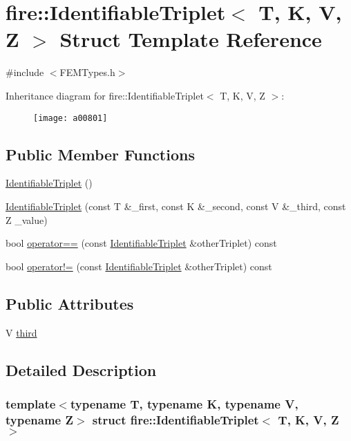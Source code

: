 \hypertarget{a00801}{}\section{fire\+:\+:Identifiable\+Triplet$<$ T, K, V, Z $>$ Struct Template Reference}
\label{a00801}


{\ttfamily \#include $<$F\+E\+M\+Types.\+h$>$}

Inheritance diagram for fire\+:\+:Identifiable\+Triplet$<$ T, K, V, Z $>$\+:\begin{figure}[H]
\begin{center}
\leavevmode
\texttt{[image: a00801]}
\end{center}
\end{figure}
\subsection*{Public Member Functions}
\begin{DoxyCompactItemize}
\item 
\hyperlink{a00801_aadcc9b484d16fc1f286e969bad059976}{Identifiable\+Triplet} ()
\item 
\hyperlink{a00801_a4c43fb95e33d2b67ffb934991a986b68}{Identifiable\+Triplet} (const T \&\+\_\+first, const K \&\+\_\+second, const V \&\+\_\+third, const Z \+\_\+value)
\item 
bool \hyperlink{a00801_a3b79a05585bf33cc7aef48697a804be1}{operator==} (const \hyperlink{a00801}{Identifiable\+Triplet} \&other\+Triplet) const
\item 
bool \hyperlink{a00801_a290e248f174f39b7df8b2017f77c179f}{operator!=} (const \hyperlink{a00801}{Identifiable\+Triplet} \&other\+Triplet) const
\end{DoxyCompactItemize}
\subsection*{Public Attributes}
\begin{DoxyCompactItemize}
\item 
V \hyperlink{a00801_a0f60248b00531643f3c6bb8e68781f04}{third}
\end{DoxyCompactItemize}


\subsection{Detailed Description}
\subsubsection*{template$<$typename T, typename K, typename V, typename Z$>$\newline
struct fire\+::\+Identifiable\+Triplet$<$ T, K, V, Z $>$}

